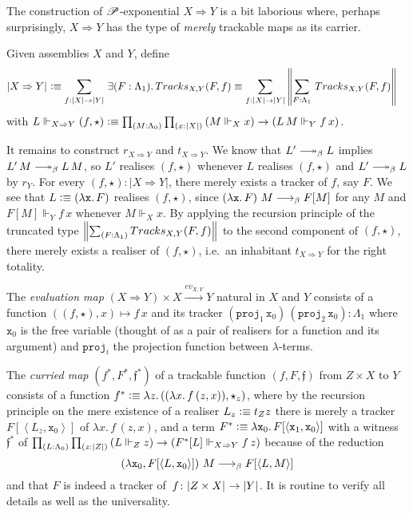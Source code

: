 \documentclass[a4paper,UKenglish,numberwithinsect,cleveref,thm-restate,draft]{lipics-v2021}
\numberwithin{equation}{section}
\theoremstyle{definition}
\theoremstyle{plain}
\begin{document}
The construction of $\PP$-exponential $X \Rightarrow Y$ is a bit laborious where, perhaps surprisingly, $X \Rightarrow Y$ has the type of \emph{merely} trackable maps as its carrier.
\begin{example}[$\PP$-Exponential]
  Given assemblies $X$ and $Y$, define
  \begin{align*}
    \bproj{X \Rightarrow Y} & \defeq \sm{f : |X| \to |Y|} \exis{F : \Lambda_1} \mathsf{Tracks}_{X, Y}(F, f) \equiv \sm{f : |X| \to |Y|} \brck{\sm{F : \Lambda_1} \mathsf{Tracks}_{X, Y}(F, f) }
  \end{align*}
  with $L \Vdash_{X \Rightarrow Y} (f, \star) \defeq \prd{M : \Lambda_0}{x : |X|} \left( M \Vdash_X x\right) \to \left(L\,M \Vdash_Y f\,x\right)$.

  It remains to construct $r_{X\Rightarrow Y}$ and $t_{X \Rightarrow Y}$. 
  We know that $L' \reduce L$ implies $L'\,M \reduce L\,M$, so $L'$ realises $(f, \star)$ whenever $L$ realises $(f, \star)$ and $L' \reduce L$ by $r_Y$.
  For every $(f, \star) : |X \Rightarrow Y|$, there merely exists a tracker of $f$, say $F$.
  We see that $L \vcentcolon\equiv \left(\mathtt{\lambda x}.\,F\right)$ realises $(f, \star)$, since
  $\left(\mathtt{\lambda x}.\,F\right)\,M \longrightarrow_{\beta} F[M]$ for any $M$ and $F[M] \Vdash_Y f\,x$ whenever $M \Vdash_X x$.
  By applying the recursion principle of the truncated type $\brck{\sm{F : \Lambda_1} \mathsf{Tracks}_{X, Y}(F, f) }$ to the second component of $(f, \star)$, there merely exists a realiser of $(f, \star)$, i.e.\ an inhabitant $t_{X \Rightarrow Y}$ for the right totality.

  The \emph{evaluation map} $(X \Rightarrow Y) \times X \xrightarrow{ev_{X, Y}} Y$ natural in $X$ and $Y$ consists of a function
  $((f, \star) , x) \mapsto f\,x$ and its tracker $(\mathtt{proj}_1\, \mathtt{x}_0)\,(\mathtt{proj}_2\, \mathtt{x}_0) : \Lambda_1$ where $\mathtt{x}_0$ is the free variable (thought of as a pair of realisers for a function and its argument) and $\mathtt{proj}_i$ the projection function between $\lambda$-terms.

  The \emph{curried map} $(f^*, F^*, \mathfrak{f}^*)$ of a trackable function $(f, F, \mathfrak{f})$ from $Z \times X$ to $Y$ consists of
    a function
      $f^* \vcentcolon\equiv \lambda z.\, ((\lambda x.\, f\,(z, x)) , \star_z)$, 
      where by the recursion principle on the mere existence of a realiser $L_z \vcentcolon\equiv t_Z z$ there is merely a tracker~$F[\left< L_z , \mathtt{x}_0 \right>]$ of $\lambda x.\, f\,(z, x)$, and
    a term $F^* \vcentcolon\equiv \lambda \mathtt{x}_0.\, F[ \left< \mathtt{x}_1, \mathtt{x}_0 \right> ]$ with 
    a witness $\mathfrak{f}^*$ of $\prd{L : \Lambda_0}{z : |Z|} \left(L \Vdash_Z z\right) \to \left(F^*[L] \Vdash_{X \Rightarrow Y} f\, z\right)$ because of the reduction
      \[
        \left(\lambda \mathtt{x}_0, F[\left< L , \mathtt{x}_0 \right>]\right)\,M \longrightarrow_{\beta} F[\left< L , M \right>]
      \]
      and that $F$ is indeed a tracker of~$f\colon \mathopen{}\left|Z \times X\right|_{}^{}\mathclose{} \to \mathopen{}\left|Y\right|_{}^{}\mathclose{}$. 
  It is routine to verify all details as well as the universality.
\end{example}
\end{document}

